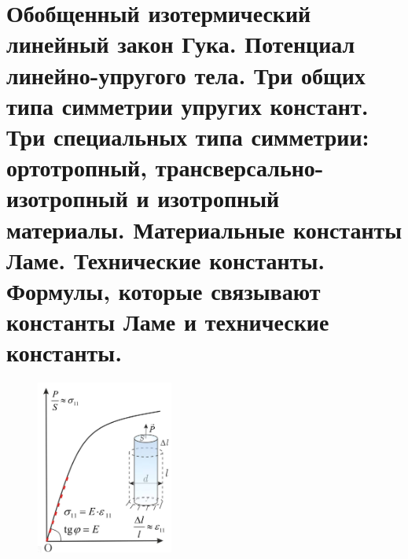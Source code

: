 \section{Обобщенный изотермический линейный закон Гука. Потенциал линейно-упругого тела.  Три общих типа симметрии упругих констант. Три специальных типа симметрии: ортотропный, трансверсально-изотропный и изотропный материалы. Материальные константы Ламе. Технические константы. Формулы, которые связывают константы Ламе и технические константы.}

\begin{figure}[h!]
  \centering
  \includegraphics[width=0.4\textwidth]{images/12.1.jpg} 
\end{figure}


